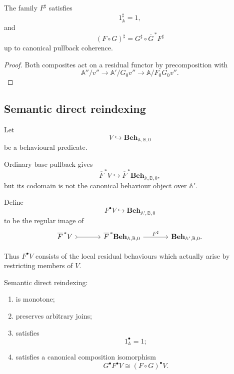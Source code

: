 \begin{proposition}
\label{prop:pseudonaturality-residual-restriction}
The family \(F^\sharp\) satisfies
\[
    1_{\mathbb A}^\sharp
    =
    1,
\]
and
\[
    (F\circ G)^\sharp
    =
    G^\sharp
    \circ
    \overline G^{\,\ast}F^\sharp
\]
up to canonical pullback coherence.
\end{proposition}

\begin{proof}
Both composites act on a residual functor by precomposition with
\[
    \mathbb A''/v''
    \to
    \mathbb A'/G_0v''
    \to
    \mathbb A/F_0G_0v''.
\]
\end{proof}

\subsection{Semantic direct reindexing}
\label{subsec:semantic-direct-reindexing}

Let
\[
    V
    \hookrightarrow
    \mathbf{Beh}_{\mathbb A,\mathbb B,0}
\]
be a behavioural predicate.

Ordinary base pullback gives
\[
    \overline F^{\,\ast}V
    \hookrightarrow
    \overline F^{\,\ast}
    \mathbf{Beh}_{\mathbb A,\mathbb B,0},
\]
but its codomain is not the canonical behaviour object over
\(\mathbb A'\).

\begin{definition}
\label{def:semantic-direct-reindexing}
Define
\[
    F^\bullet V
    \hookrightarrow
    \mathbf{Beh}_{\mathbb A',\mathbb B,0}
\]
to be the regular image of
\[
\begin{tikzcd}[column sep=large]
    \overline F^{\,\ast}V
        \arrow[r, tail]
    &
    \overline F^{\,\ast}
    \mathbf{Beh}_{\mathbb A,\mathbb B,0}
        \arrow[r, "F^\sharp"]
    &
    \mathbf{Beh}_{\mathbb A',\mathbb B,0}.
\end{tikzcd}
\]
\end{definition}

Thus \(F^\bullet V\) consists of the local residual behaviours which actually
arise by restricting members of \(V\).

\begin{proposition}
\label{prop:basic-properties-semantic-direct-reindexing}
Semantic direct reindexing:
\begin{enumerate}
    \item is monotone;
    \item preserves arbitrary joins;
    \item satisfies
    \[
        1_{\mathbb A}^\bullet
        =
        1;
    \]
    \item satisfies a canonical composition isomorphism
    \[
        G^\bullet F^\bullet V
        \cong
        (F\circ G)^\bullet V.
    \]
\end{enumerate}
\end{proposition}


